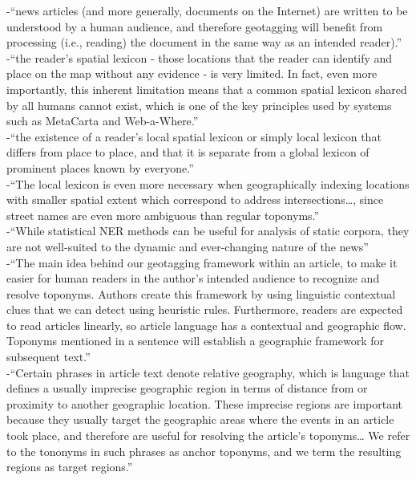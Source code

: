 -{\color{orange}“news articles (and more generally, documents on the Internet) are written to be understood by a human audience, and therefore geotagging will benefit from processing (i.e., reading) the document in the same way as an intended reader).”\cite{Lieberman2010}}\\
-{\color{orange}“the reader’s spatial lexicon - those locations that the reader can identify and place on the map without any evidence - is very limited. In fact, even more importantly, this inherent limitation means that a common spatial lexicon shared by all humans cannot exist, which is one of the key principles used by systems such as MetaCarta and Web-a-Where.”\cite{Lieberman2010}}\\
-{\color{orange}“the existence of a reader’s local spatial lexicon or simply local lexicon that differs from place to place, and that it is separate from a global lexicon of prominent places known by everyone.”\cite{Lieberman2010}}\\
-{\color{orange}“The local lexicon is even more necessary when geographically indexing locations with smaller spatial extent which correspond to address intersections…, since street names are even more ambiguous than regular toponyms.”\cite{Lieberman2010}}\\
-{\color{orange}“While statistical NER methods can be useful for analysis of static corpora, they are not well-suited to the dynamic and ever-changing nature of the news”\cite{Lieberman2010}}\\
-{\color{orange}“The main idea behind our geotagging framework within an article, to make it easier for human readers in the author’s intended audience to recognize and resolve toponyms. Authors create this framework by using linguistic contextual clues that we can detect using heuristic rules. Furthermore, readers are expected to read articles linearly, so article language has a contextual and geographic flow. Toponyms mentioned in a sentence will establish a geographic framework for subsequent text.”\cite{Lieberman2010}}\\
-{\color{orange}“Certain phrases in article text denote relative geography, which is language that defines a usually imprecise geographic region in terms of distance from or proximity to another geographic location. These imprecise regions are important because they usually target the geographic areas where the events in an article took place, and therefore are useful for resolving the article’s toponyms… We refer to the tononyms in such phrases as anchor toponyms, and we term the resulting regions as target regions.”\cite{Lieberman2010}}\\
